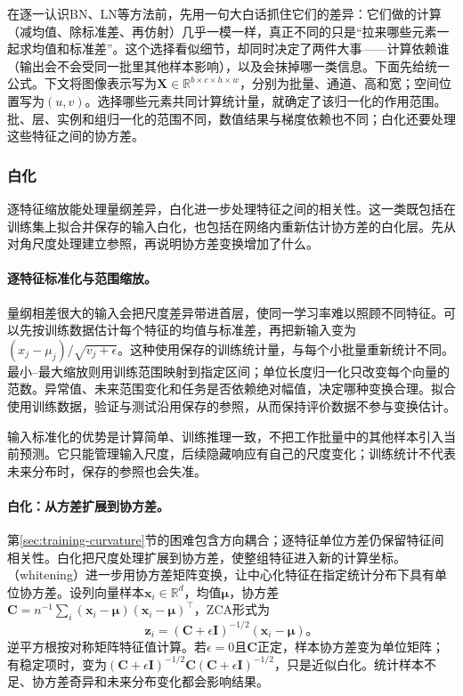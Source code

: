 在逐一认识BN、LN等方法前，先用一句大白话抓住它们的差异：它们做的计算（减均值、除标准差、再仿射）几乎一模一样，真正不同的只是“拉来哪些元素一起求均值和标准差”。这个选择看似细节，却同时决定了两件大事——计算依赖谁（输出会不会受同一批里其他样本影响），以及会抹掉哪一类信息。下面先给统一公式。下文将图像表示写为$\bm X\in\mathbb R^{b\times c\times h\times w}$，分别为批量、通道、高和宽；空间位置写为$(u,v)$。选择哪些元素共同计算统计量，就确定了该归一化的作用范围。批、层、实例和组归一化的范围不同，数值结果与梯度依赖也不同；白化还要处理这些特征之间的协方差。

\subsubsection{白化}
\label{sec:training-whitening}
\label{sec:training-input-scaling}
\label{sec:training-input-response-normalization}
\label{sec:training-other-whitening}
逐特征缩放能处理量纲差异，白化进一步处理特征之间的相关性。这一类既包括在训练集上拟合并保存的输入白化，也包括在网络内重新估计协方差的白化层。先从对角尺度处理建立参照，再说明协方差变换增加了什么。

\paragraph{逐特征标准化与范围缩放。}

量纲相差很大的输入会把尺度差异带进首层，使同一学习率难以照顾不同特征。可以先按训练数据估计每个特征的均值与标准差，再把新输入变为$(x_j-\mu_j)/\sqrt{v_j+\epsilon}$。这种使用保存的训练统计量，与每个小批量重新统计不同。最小--最大缩放则用训练范围映射到指定区间；单位长度归一化只改变每个向量的范数。异常值、未来范围变化和任务是否依赖绝对幅值，决定哪种变换合理。拟合使用训练数据，验证与测试沿用保存的参照，从而保持评价数据不参与变换估计。

输入标准化的优势是计算简单、训练推理一致，不把工作批量中的其他样本引入当前预测。它只能管理输入尺度，后续隐藏响应有自己的尺度变化；训练统计不代表未来分布时，保存的参照也会失准。

\paragraph{白化：从方差扩展到协方差。}

第\ref{sec:training-curvature}节的困难包含方向耦合；逐特征单位方差仍保留特征间相关性。白化把尺度处理扩展到协方差，使整组特征进入新的计算坐标。（whitening）进一步用协方差矩阵变换，让中心化特征在指定统计分布下具有单位协方差。设列向量样本$\bm x_i\in\mathbb R^d$，均值$\bm\mu$，协方差$\bm C=n^{-1}\sum_i(\bm x_i-\bm\mu)(\bm x_i-\bm\mu)^{\top}$，ZCA形式为
\begin{equation}
  \bm z_i=(\bm C+\epsilon\bm I)^{-1/2}(\bm x_i-\bm\mu)\text{。}
  \label{eq:training-whitening}
\end{equation}
逆平方根按对称矩阵特征值计算。若$\epsilon=0$且$\bm C$正定，样本协方差变为单位矩阵；有稳定项时，变为$(\bm C+\epsilon\bm I)^{-1/2}\bm C(\bm C+\epsilon\bm I)^{-1/2}$，只是近似白化。统计样本不足、协方差奇异和未来分布变化都会影响结果。

